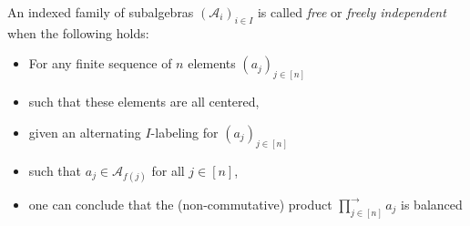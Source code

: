 \begin{definition}
  \label{def:FreeIndep}
  An indexed family of subalgebras \((\mathcal{A}_i)_{i\in I}\) is called \textit{free} or
  \textit{freely independent} when the following holds:
  \begin{itemize}
    \item For any finite sequence of \(n\) elements \((a_j)_{j\in [n]}\)
    \item such that these elements are all centered,
    \item given an alternating \(I\)-labeling for \((a_j)_{j\in [n]}\)
    \item such that \(a_j \in \mathcal{A}_{f(j)}\) for all \(j\in [n]\),
    \item one can conclude that the (non-commutative) product
      \(\prod_{j\in[n]}^{\rightarrow} a_j\) is balanced
  \end{itemize}
\end{definition}

